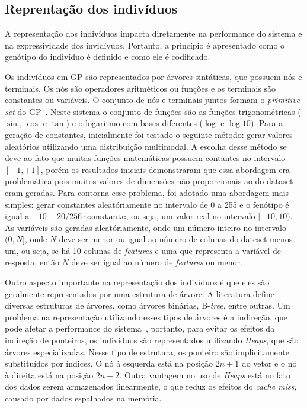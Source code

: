\documentclass[a4paper]{article}
\begin{document}
\subsection{Reprentação dos indivíduos} \label{subsec:representacao}
A representação dos indivíduos impacta diretamente na performance do sistema e
na expressividade dos invidívuos. Portanto, a princípio é apresentado como o
genótipo do indivíduo é definido e como ele é codificado.


Os indivíduos em GP são representados por árvores sintáticas, que possuem nós e
terminais. Os nós são operadores aritméticos ou funções e os terminais são
constantes ou variáveis. O conjunto de nós e terminais juntos formam o
\textit{primitive set} do GP~\citep{poli2008}. Neste sistema o conjunto de
funções são as funções trigonométricas ($\sin$, $\cos$ e $\tan$) e o logaritmo
com bases diferentes ($\log$ e $\log10$). Para a geração de constantes,
inicialmente foi testado o seguinte método: gerar valores aleatórios utilizando
uma distribuição multimodal. A escolha desse método se deve ao fato que muitas
funções matemáticas possuem contantes no intervalo $[-1, +1]$, porém os
resultados iniciais demonstraram que essa abordagem era problemática pois muitos
valores de dimensões não proporcionais ao do dataset eram geradas. Para contorna
esse problema, foi adotado uma abordagem mais simples: gerar constantes
aleatóriamente no intervalo de 0 a 255 e o fenótipo é igual a $-10+20/256\cdot
\texttt{constante}$, ou seja, um valor real no intervalo $[-10, 10)$.  As
  variáveis são geradas aleatóriamente, onde um número inteiro no intervalo $(0,
  N]$, onde $N$ deve ser menor ou igual ao número de colunas do dateset menos
um, ou seja, se há 10 colunas de \textit{features} e uma que representa a
variável de resposta, então $N$ deve ser igual ao número de \textit{features} ou
menor.

Outro aspecto importante na representação dos indivíduos é que eles são
geralmente representados por uma estrutura de árvore. A literatura define
diversas estruturas de árvores, como árvores binárias, B-\textit{tree}, entre
outras. Um problema na representação utilizando esses tipos de árvores é a
indireção, que pode afetar a performance do sistema~\citep{faria2013}, portanto,
para evitar os efeitos da indireção de ponteiros, os indivíduos são
representados utilizando \textit{Heaps}, que são árvores especializadas. Nesse
tipo de estrutura, os ponteiro são implicitamente substituídos por índices. O nó
à esquerda está na posição $2n+1$ do vetor e o nó à direita está na posição $2n
+ 2$. Outra vantagem no uso de \textit{Heaps} está no fato dos dados serem
armazenados linearmente, o que reduz os efeitos do \textit{cache miss}, causado
por dados espalhados na memória.
\end{document}
